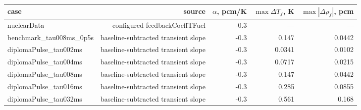 \begin{tabular}{lrrrr}
\hline
case & source & $\alpha$, pcm/K & $\max\Delta T_f$, K & $\max|\Delta\rho_f|$, pcm\\
\hline
nuclearData & configured feedbackCoeffTFuel & -0.3 & --- & ---\\
benchmark\_tau008ms\_0p5s & baseline-subtracted transient slope & -0.3 & 0.147 & 0.0442\\
diplomaPulse\_tau002ms & baseline-subtracted transient slope & -0.3 & 0.0341 & 0.0102\\
diplomaPulse\_tau004ms & baseline-subtracted transient slope & -0.3 & 0.0717 & 0.0215\\
diplomaPulse\_tau008ms & baseline-subtracted transient slope & -0.3 & 0.147 & 0.0442\\
diplomaPulse\_tau016ms & baseline-subtracted transient slope & -0.3 & 0.285 & 0.0855\\
diplomaPulse\_tau032ms & baseline-subtracted transient slope & -0.3 & 0.561 & 0.168\\
\hline
\end{tabular}
